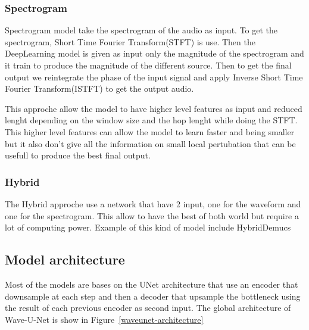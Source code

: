 \documentclass[final]{cvpr}
\begin{document}
\subsubsection{Spectrogram}

Spectrogram model take the spectrogram of the audio as input.
To get the spectrogram, Short Time Fourier Transform(STFT) is use.
Then the DeepLearning model is given as input only the magnitude of the spectrogram and it train to produce the magnitude of the different source.
Then to get the final output we reintegrate the phase of the input signal and apply Inverse Short Time Fourier Transform(ISTFT) to get the output audio.

This approche allow the model to have higher level features as input and reduced lenght depending on the window size and the hop lenght while doing the STFT.
This higher level features can allow the model to learn faster and being smaller but it also don't give all the information on small local pertubation that can be usefull to produce the best final output.


\subsubsection{Hybrid}
The Hybrid approche use a network that have 2 input, one for the waveform and one for the spectrogram.
This allow to have the best of both world but require a lot of computing power. Example of this kind of model include HybridDemucs \cite{hybrid-demucs}

\subsection{Model architecture}

Most of the models are bases on the UNet architecture that use an encoder that downsample at each step and then a decoder that upsample the bottleneck using the result of each previous encoder as second input.
The global architecture of Wave-U-Net\cite{waveunet} is show in Figure~\ref{waveunet-architecture}
\end{document}

